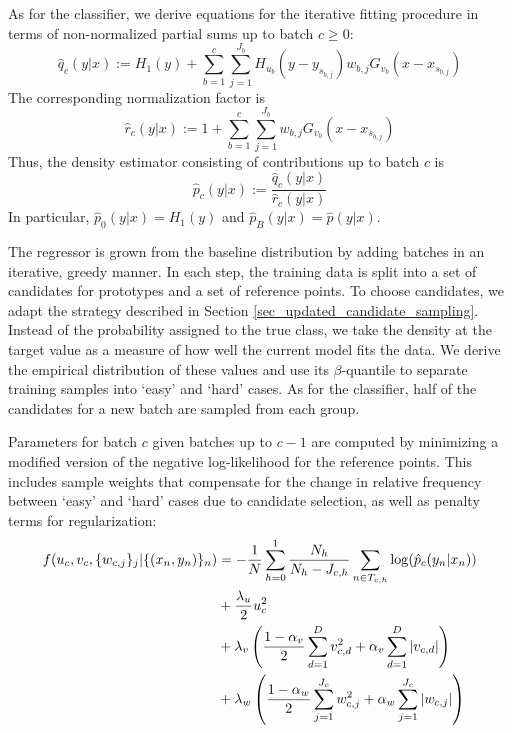 %
As for the classifier, we derive equations for the iterative fitting procedure in terms of non-normalized partial sums up to batch $c\geq0$:
%
\begin{equation}
\hat{q}_c(y|x):=H_1(y)+\sum_{b=1}^c\sum_{j=1}^{J_b}H_{u_b}(y-y_{s_{b,j}})w_{b,j}G_{v_b}(x-x_{s_{b,j}})\label{eq_hatqcxy}
\end{equation}
%
The corresponding normalization factor is
%
\begin{equation}
\hat{r}_c(y|x):=1+\sum_{b=1}^c\sum_{j=1}^{J_b}w_{b,j}G_{v_b}(x-x_{s_{b,j}})\label{eq_hatrcxy}
\end{equation}
%
Thus, the density estimator consisting of contributions up to batch $c$ is
%
\begin{equation}
\hat{p}_c(y|x):=\frac{\hat{q}_c(y|x)}{\hat{r}_c(y|x)}\label{eq_hatpcxy}
\end{equation}
%
In particular, $\hat{p}_0(y|x)=H_1(y)$ and $\hat{p}_B(y|x)=\hat{p}(y|x)$.\par
%
The regressor is grown from the baseline distribution by adding batches in an iterative, greedy manner.
In each step, the training data is split into a set of candidates for prototypes and a set of reference points.
To choose candidates, we adapt the strategy described in Section \ref{sec_updated_candidate_sampling}.
Instead of the probability assigned to the true class, we take the density at the target value as a measure of how well the current model fits the data.
We derive the empirical distribution of these values and use its $\beta$-quantile to separate training samples into `easy' and `hard' cases.
As for the classifier, half of the candidates for a new batch are sampled from each group.\par
%
Parameters for batch $c$ given batches up to $c-1$ are computed by minimizing a modified version of the negative log-likelihood for the reference points.
This includes sample weights that compensate for the change in relative frequency between `easy' and `hard' cases due to candidate selection, as well as penalty terms for regularization: 
%
\begin{align}
f(u_c,v_c,\{w_{c,j}\}_j|\{(x_n,y_n)\}_n)&
=-\frac{1}{N}\sum_{h=0}^1\frac{N_h}{N_h-J_{c,h}}\sum_{n\in T_{c,h}}\log(\hat{p}_c(y_n|x_n))
\label{eq_nll_regressor}\\
&+\frac{\lambda_u}{2}u_c^2\notag\\
&+\lambda_v\left(\frac{1-\alpha_v}{2}\sum_{d=1}^Dv_{c,d}^2+\alpha_v\sum_{d=1}^D|v_{c,d}|\right)\notag\\
&+\lambda_w\left(\frac{1-\alpha_w}{2}\sum_{j=1}^{J_c}w_{c,j}^2+\alpha_w\sum_{j=1}^{J_c}|w_{c,j}|\right)\notag
\end{align}
